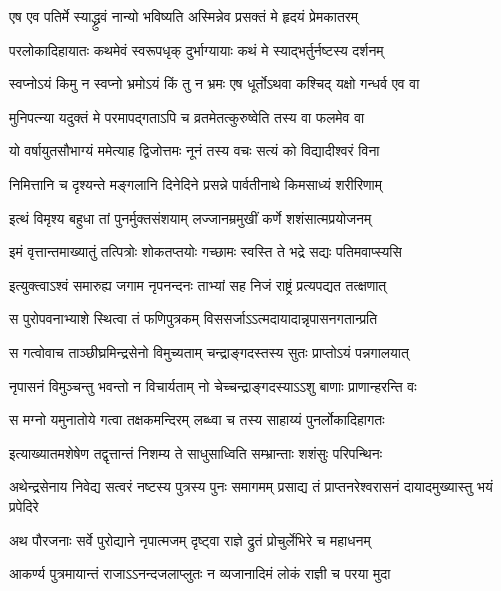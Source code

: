 \twolineshloka
{एष एव पतिर्मे स्याद्ध्रुवं नान्यो भविष्यति}
{अस्मिन्नेव प्रसक्तं मे हृदयं प्रेमकातरम्} %

\twolineshloka
{परलोकादिहायातः कथमेवं स्वरूपधृक्}
{दुर्भाग्यायाः कथं मे स्याद्भर्तुर्नष्टस्य दर्शनम्} %

\twolineshloka
{स्वप्नोऽयं किमु न स्वप्नो भ्रमोऽयं किं तु न भ्रमः}
{एष धूर्तोऽथवा कश्चिद् यक्षो गन्धर्व एव वा} %

\twolineshloka
{मुनिपत्न्या यदुक्तं मे परमापद्गताऽपि च}
{व्रतमेतत्कुरुष्वेति तस्य वा फलमेव वा} %

\twolineshloka
{यो वर्षायुतसौभाग्यं ममेत्याह द्विजोत्तमः}
{नूनं तस्य वचः सत्यं को विद्यादीश्वरं विना} %

\twolineshloka
{निमित्तानि च दृश्यन्ते मङ्गलानि दिनेदिने}
{प्रसन्ने पार्वतीनाथे किमसाध्यं शरीरिणाम्} %

\twolineshloka
{इत्थं विमृश्य बहुधा तां पुनर्मुक्तसंशयाम्}
{लज्जानम्रमुखीं कर्णे शशंसात्मप्रयोजनम्} %

\twolineshloka
{इमं वृत्तान्तमाख्यातुं तत्पित्रोः शोकतप्तयोः}
{गच्छामः स्वस्ति ते भद्रे सद्यः पतिमवाप्स्यसि} %

\twolineshloka
{इत्युक्त्वाऽश्वं समारुह्य जगाम नृपनन्दनः}
{ताभ्यां सह निजं राष्ट्रं प्रत्यपद्यत तत्क्षणात्} %

\twolineshloka
{स पुरोपवनाभ्याशे स्थित्वा तं फणिपुत्रकम्}
{विससर्जाऽऽत्मदायादान्नृपासनगतान्प्रति} %

\twolineshloka
{स गत्वोवाच ताञ्छीघ्रमिन्द्रसेनो विमुच्यताम्}
{चन्द्राङ्गदस्तस्य सुतः प्राप्तोऽयं पन्नगालयात्} %

\twolineshloka
{नृपासनं विमुञ्चन्तु भवन्तो न विचार्यताम्}
{नो चेच्चन्द्राङ्गदस्याऽऽशु बाणाः प्राणान्हरन्ति वः} %

\twolineshloka
{स मग्नो यमुनातोये गत्वा तक्षकमन्दिरम्}
{लब्ध्वा च तस्य साहाय्यं पुनर्लोकादिहागतः} %

\twolineshloka
{इत्याख्यातमशेषेण तद्वृत्तान्तं निशम्य ते}
{साधुसाध्विति सम्भ्रान्ताः शशंसुः परिपन्थिनः} %

\fourlineindentedshloka
{अथेन्द्रसेनाय निवेद्य सत्वरं}
{नष्टस्य पुत्रस्य पुनः समागमम्}
{प्रसाद्य तं प्राप्तनरेश्वरासनं}
{दायादमुख्यास्तु भयं प्रपेदिरे} %

\twolineshloka
{अथ पौरजनाः सर्वे पुरोद्याने नृपात्मजम्}
{दृष्ट्वा राज्ञे द्रुतं प्रोचुर्लेभिरे च महाधनम्} %

\twolineshloka
{आकर्ण्य पुत्रमायान्तं राजाऽऽनन्दजलाप्लुतः}
{न व्यजानादिमं लोकं राज्ञी च परया मुदा} %

